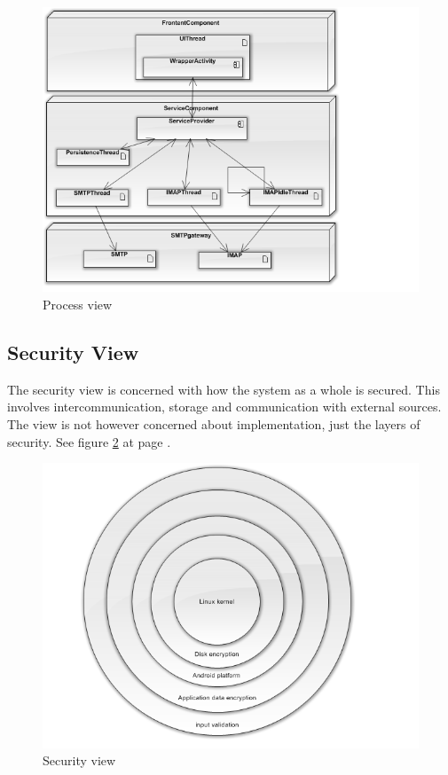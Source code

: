 \begin{figure}
	\includegraphics[width=\textwidth]{processview.png}
	\caption{Process view}
	\label{fig:processview}
\end{figure}

\subsection{Security View}
The security view is concerned with how the system as a whole is secured. This involves intercommunication, storage and communication with external sources. The view is not however concerned about implementation, just the layers of security.
See figure \ref{fig:securityview} at page \pageref{fig:securityview}.

\begin{figure}
	\includegraphics[width=\textwidth]{securityview.png}
	\caption{Security view}
	\label{fig:securityview}
\end{figure}

